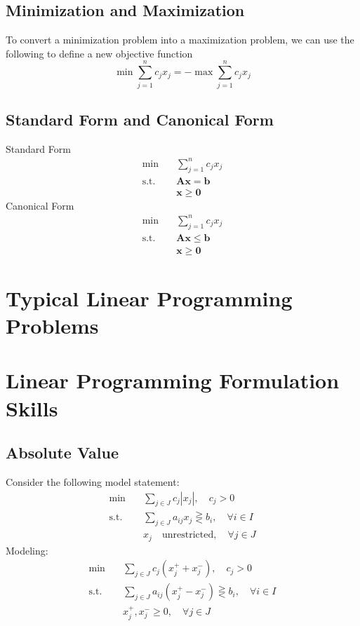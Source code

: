 			\subsection{Minimization and Maximization}
				To convert a minimization problem into a maximization problem, we can use the following to define a new objective function
				\begin{equation}
					\min \sum_{j=1}^nc_jx_j = -\max \sum_{j=1}^n c_jx_j 
				\end{equation}

			\subsection{Standard Form and Canonical Form}
				Standard Form
				\begin{align}
					\min \quad & \sum_{j=1}^nc_jx_j \\
					\text{s.t.} \quad & \mathbf{Ax} = \mathbf{b} \\
									  & \mathbf{x} \ge \mathbf{0} 
				\end{align}
				Canonical Form
				\begin{align}
					\min \quad & \sum_{j=1}^nc_jx_j \\
					\text{s.t.} \quad & \mathbf{Ax} \le \mathbf{b} \\
									  & \mathbf{x} \ge \mathbf{0}
				\end{align}

		\section{Typical Linear Programming Problems}

		\section{Linear Programming Formulation Skills}
			\subsection{Absolute Value}
				Consider the following model statement:
				\begin{align}
					\min \quad & \sum_{j\in J}c_j|x_j|, \quad c_j > 0 \\
					\text{s.t.} \quad & \sum_{j\in J}a_{ij}x_j \gtreqless b_i, \quad \forall i\in I \\
					                  & x_j \quad \text{unrestricted}, \quad \forall j\in J 
				\end{align}
				Modeling:
				\begin{align}
					\min \quad & \sum_{j\in J}c_j(x_j^+ + x_j^-), \quad c_j > 0 \\
					\text{s.t.} \quad & \sum_{j\in J}a_{ij}(x_j^+ - x_j^-) \gtreqless b_i, \quad \forall i\in I \\
					                  & x_j^+, x_j^- \ge 0, \quad \forall j\in J 
				\end{align}

